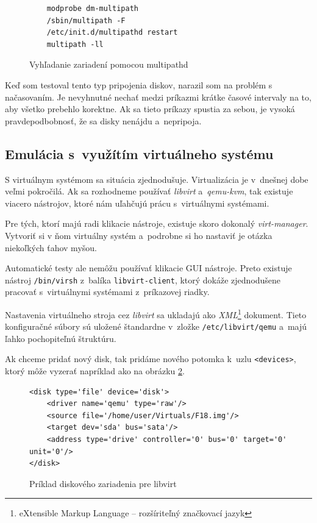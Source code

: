 \begin{figure}[H]
\begin{lstlisting}
    modprobe dm-multipath
    /sbin/multipath -F
    /etc/init.d/multipathd restart
    multipath -ll
\end{lstlisting}
\caption{Vyhľadanie zariadení pomocou multipathd}
\label{alg:multipathd}
\end{figure}

Keď som testoval tento typ pripojenia diskov, narazil som na problém s
načasovaním. Je nevyhnutné nechať medzi príkazmi krátke časové intervaly na to,
aby všetko prebehlo korektne. Ak sa tieto príkazy spustia za sebou, je vysoká
pravdepodbobnosť, že sa disky nenájdu a~nepripoja.

%
%

\subsection{Emulácia s~využítím virtuálneho systému}

S virtuálnym systémom sa situácia zjednodušuje. Virtualizácia je v~dnešnej dobe
veľmi pokročilá. Ak sa rozhodneme používať \emph{libvirt} a~\emph{qemu-kvm},
tak existuje viacero nástrojov, ktoré nám uľahčujú prácu s~virtuálnymi
systémami.

Pre tých, ktorí majú radi klikacie nástroje, existuje skoro dokonalý
\emph{virt-manager}. Vytvoriť si v ňom virtuálny systém a~podrobne si ho
nastaviť je otázka niekoľkých ťahov myšou. 

Automatické testy ale nemôžu používať klikacie GUI nástroje. Preto existuje
nástroj \texttt{/bin/virsh} z~balíka \texttt{libvirt-client}, ktorý dokáže
zjednodušene pracovať s~virtuálnymi systémami z~príkazovej riadky.  

Nastavenia virtuálneho stroja cez \emph{libvirt} sa ukladajú ako
\emph{XML}\footnote{eXtensible Markup Language -- rozšíriteľný značkovací
jazyk} dokument. Tieto konfiguračné súbory sú uložené štandardne v~zložke
\texttt{/etc/libvirt/qemu} a~majú ľahko pochopiteľnú štruktúru.

Ak chceme pridať nový disk, tak pridáme nového potomka k~uzlu
\texttt{<devices>}, ktorý môže vyzerať napríklad ako na obrázku
\ref{alg:libvirt-xml-disk}.

\begin{figure}[H]
\begin{lstlisting}
<disk type='file' device='disk'>
    <driver name='qemu' type='raw'/>
    <source file='/home/user/Virtuals/F18.img'/>
    <target dev='sda' bus='sata'/>
    <address type='drive' controller='0' bus='0' target='0' unit='0'/>
</disk>
\end{lstlisting}
\caption{Príklad diskového zariadenia pre libvirt}
\label{alg:libvirt-xml-disk}
\end{figure}

